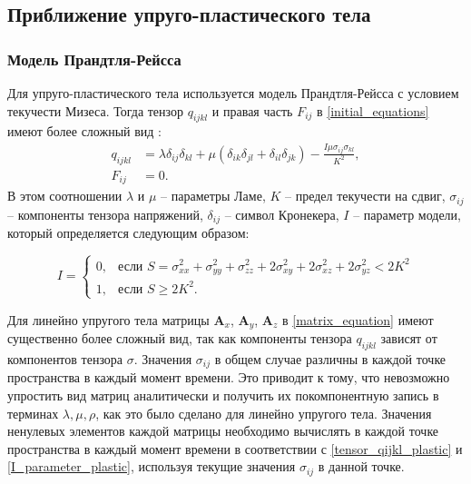 
\clearpage
\newpage

\subsection{Приближение упруго-пластического тела}

\subsubsection{Модель Прандтля-Рейсса}
\label{plastic_matrixes}

Для упруго-пластического тела используется модель Прандтля-Рейсса с условием текучести Мизеса. Тогда тензор $q_{ijkl}$ и правая часть $F_{ij}$ в \ref{initial_equations} имеют более сложный вид \cite{ivanov_kondaurov_petrov_holodov, g}:
\begin{align}
\label{tensor_qijkl_plastic}
q_{ijkl}&=\lambda\delta_{ij}\delta_{kl}+\mu(\delta_{ik}\delta_{jl}+\delta_{il}\delta_{jk})-\frac{I\mu\sigma_{ij}\sigma_{kl}}{K^2},
\nonumber\\
F_{ij}&=0.
\end{align}
В этом соотношении $\lambda$ и $\mu$ -- параметры Ламе, $K$ -- предел текучести на сдвиг, $\sigma_{ij}$ -- компоненты тензора напряжений, $\delta_{ij}$ -- символ Кронекера, $I$ -- параметр модели, который определяется следующим образом:

\begin{equation}
\label{I_parameter_plastic}
I=\begin{cases}
0, & \text{если $S = \sigma_{xx}^2+\sigma_{yy}^2+\sigma_{zz}^2+2\sigma_{xy}^2+2\sigma_{xz}^2+2\sigma_{yz}^2 < 2K^2$}\\
1, & \text{если $S \ge 2K^2$}.
\end{cases}
\end{equation}

Для линейно упругого тела матрицы $\mathbf{A}_x$, $\mathbf{A}_y$, $\mathbf{A}_z$ в \ref{matrix_equation} имеют существенно более сложный вид, так как компоненты тензора $q_{ijkl}$ зависят от компонентов тензора $\sigma$. Значения $\sigma_{ij}$ в общем случае различны в каждой точке пространства в каждый момент времени. Это приводит к тому, что невозможно упростить вид матриц аналитически и получить их покомпонентную запись в терминах $\lambda, \mu, \rho$, как это было сделано для линейно упругого тела. Значения ненулевых элементов каждой матрицы необходимо вычислять в каждой точке пространства в каждый момент времени в соответствии с \ref{tensor_qijkl_plastic} и \ref{I_parameter_plastic}, используя текущие значения $\sigma_{ij}$ в данной точке.

